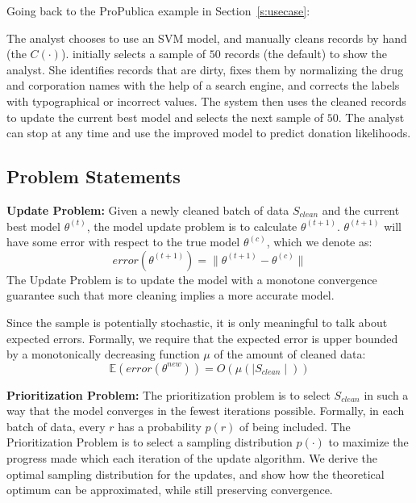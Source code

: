 Going back to the ProPublica example in Section~\ref{s:usecase}:
\begin{example}\label{archex}
The analyst chooses to use an SVM model, and manually cleans records by hand (the $C(\cdot)$).  
\sys initially selects a sample of $50$ records (the default) to show the analyst.
She identifies records that are dirty, fixes them by normalizing the drug and corporation names with the help of a search engine, and corrects the labels with typographical or incorrect values.
The system then uses the cleaned records to update the current best model and selects the next sample of $50$.
The analyst can stop at any time and use the improved model to predict donation likelihoods.
\end{example}

\subsection{Problem Statements}\label{updp}

\vspace{0.5em}

\noindent\textbf{Update Problem: } Given a newly cleaned batch of data $S_{clean}$ and the current best model $\theta^{(t)}$, the model update problem is to calculate $\theta^{(t+1)}$. 
$\theta^{(t+1)}$ will have some error with respect to the true model $\theta^{(c)}$, which we denote as:
\[
error(\theta^{(t+1)}) = \| \theta^{(t+1)} - \theta^{(c)} \|
\]
The Update Problem is to update the model with a monotone convergence guarantee such that more cleaning implies a more accurate model.

Since the sample is potentially stochastic, it is only meaningful to talk about expected errors.
Formally, we require that the expected error is upper bounded by a monotonically decreasing function $\mu$ of the amount of cleaned data:
\[
\mathbb{E}(error(\theta^{new})) = O(\mu(\mid S_{clean} \mid))
\]

\vspace{0.5em}

\noindent\textbf{Prioritization Problem: } The prioritization problem is to select $S_{clean}$ in such a way that the model converges in the fewest iterations possible. 
Formally, in each batch of data, every $r$ has a probability $p(r)$ of being included.
The Prioritization Problem is to select a sampling distribution $p(\cdot)$ to maximize the progress made which each iteration of the update algorithm.
We derive the optimal sampling distribution for the updates, and show how the theoretical optimum can be approximated, while still preserving convergence.





